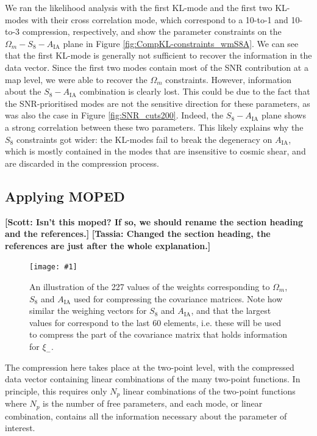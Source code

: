 \documentclass[twocolumn]{\docclass}
\newcommand{\sfig}[2]{
	\texttt{[image: \#1]}
}
\newcommand{\Svwide}[2]{
	\begin{figure}[thbp]
		\sfig{../figures/#1.pdf}{\textwidth}
		\caption{{\small #2}}
		\label{fig:#1}
	\end{figure}
}
\newcommand{\rf}[1]{Figure \ref{fig:#1}}
\newcommand\scott[1]{{\bf [Scott: #1]}}
\newcommand\tassia[1]{{\bf [Tassia: #1]}}
\begin{document}
	
	We ran the likelihood analysis with the first KL-mode and the first two KL-modes with their cross correlation mode, which correspond to a 10-to-1 and 10-to-3 compression, respectively, and show the parameter constraints on the $\Omega_m - S_8 - A_{\mathrm{IA}}$ plane in Figure \ref{fig:CompKL-constraints_wmS8A}. We can see that the first KL-mode is generally not sufficient to recover the information in the data vector. Since the first two modes contain most of the SNR contribution at a map level, we were able to recover the $\Omega_m$ constraints. However, information about the $S_8-A_{\mathrm{IA}}$ combination is clearly lost. This could be due to the fact that the SNR-prioritised modes are not the sensitive direction for these parameters, as was also the case in \rf{SNR_cuts200}. Indeed, the $S_8 - A_{\mathrm{IA}}$ plane shows a strong correlation between these two parameters. This likely explains why the $S_8$ constraints got wider: the KL-modes fail to break the degeneracy on $A_{\mathrm{IA}}$, which is mostly contained in the modes that are insensitive to cosmic shear, and are discarded in the compression process.
	
	\subsection{Applying MOPED}
	\label{subsec:2pt_compression}
	\scott{Isn't this moped? If so, we should rename the section heading and the references.}
	\tassia{Changed the section heading, the references are just after the whole explanation.}
	
	\Svwide{Weights_2pt}{An illustration of the 227 values of the weights corresponding to $\Omega_m$, $S_8$ and $A_{\mathrm{IA}}$ used for compressing the covariance matrices. Note how similar the weighing vectors for $S_8$ and $A_{\mathrm{IA}}$, and that the largest values for correspond to the last 60 elements, i.e. these will be used to compress the part of the covariance matrix that holds information for $\xi_-$.}
	
	The compression here takes place at the two-point level, with the compressed data vector containing linear combinations of the many two-point functions. In principle, this requires only $N_p$ linear combinations of the two-point functions where $N_p$ is the number of free parameters, and each mode, or linear combination, contains all the information necessary about the parameter of interest. 
	
\end{document}

